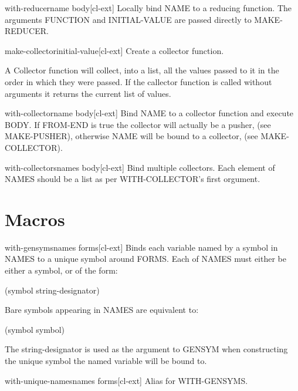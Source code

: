 \documentclass[10pt,english]{book}
\begin{document}
\begin{macro}{with-reducer}{name \body body}[cl-ext]
  Locally bind NAME to a reducing function. The arguments
FUNCTION and INITIAL-VALUE are passed directly to MAKE-REDUCER.
\end{macro}

\begin{function}{make-collector}{\op initial-value}[cl-ext]
  Create a collector function.

A Collector function will collect, into a list, all the values
passed to it in the order in which they were passed. If the
callector function is called without arguments it returns the
current list of values.
\end{function}

\begin{macro}{with-collector}{name \body body}[cl-ext]
  Bind NAME to a collector function and execute BODY. If
  FROM-END is true the collector will actually be a pusher, (see
  MAKE-PUSHER), otherwise NAME will be bound to a collector,
  (see MAKE-COLLECTOR).
\end{macro}

\begin{macro}{with-collectors}{names \body body}[cl-ext]
  Bind multiple collectors. Each element of NAMES should be a
  list as per WITH-COLLECTOR's first orgument.
\end{macro}

\section{Macros}
\label{sec:macros}

\begin{macro}{with-gensyms}{names \body forms}[cl-ext]
  Binds each variable named by a symbol in NAMES to a unique symbol around
FORMS. Each of NAMES must either be either a symbol, or of the form:

 (symbol string-designator)

Bare symbols appearing in NAMES are equivalent to:

 (symbol symbol)

The string-designator is used as the argument to GENSYM when constructing the
unique symbol the named variable will be bound to.
\end{macro}

\begin{macro}{with-unique-names}{names \body forms}[cl-ext]
  Alias for WITH-GENSYMS.
\end{macro}
\end{document}
